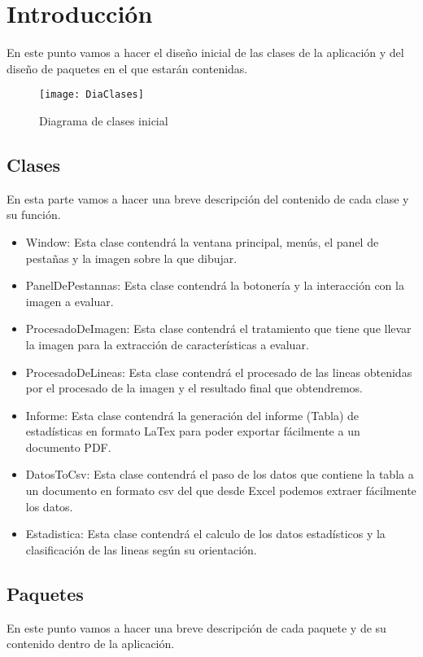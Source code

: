 
\section{Introducción}
En este punto vamos a hacer el diseño inicial de las clases de la aplicación y del diseño de paquetes en el que estarán contenidas.

\begin{figure}[h]
	\centering
	\texttt{[image: DiaClases]}
	\caption{Diagrama de clases inicial}
	\label{fig:C.1.1}
\end{figure}
 


\subsection{Clases}
En esta parte vamos a hacer una breve descripción del contenido de cada clase y su función.

\begin{itemize}
\item Window:
Esta clase contendrá la ventana principal, menús, el panel de pestañas y la imagen sobre la que dibujar.
\item PanelDePestannas:
Esta clase contendrá la botonería y la interacción con la imagen a evaluar.
\item ProcesadoDeImagen:
Esta clase contendrá el tratamiento que tiene que llevar la imagen para la extracción de características a evaluar.
\item ProcesadoDeLineas:
Esta clase contendrá el procesado de las lineas obtenidas por el procesado de la imagen y el resultado final que obtendremos.
\item Informe: 
Esta clase contendrá la generación del informe (Tabla) de estadísticas en formato LaTex para poder exportar fácilmente a un documento PDF.
\item DatosToCsv:
Esta clase contendrá el paso de los datos que contiene la tabla a un documento en formato csv del que desde Excel podemos extraer fácilmente los datos.
\item Estadistica: 
Esta clase contendrá el calculo de los datos estadísticos y la clasificación de las lineas según su orientación.

\end{itemize}

\subsection{Paquetes}
En este punto vamos a hacer una breve descripción de cada paquete y de su contenido dentro de la aplicación.


